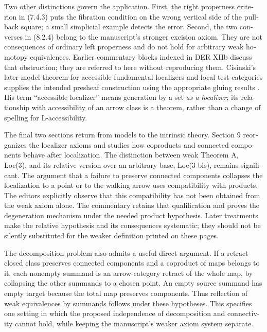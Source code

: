 \begin{otherlanguage}{english}
Two other distinctions govern the application. First, the right properness criterion in (7.4.3) puts the fibration condition on the wrong vertical side of the pullback square; a small simplicial example detects the error. Second, the two converses in (8.2.4) belong to the manuscript's stronger excision axiom. They are not consequences of ordinary left properness and do not hold for arbitrary weak homotopy equivalences. Earlier commentary blocks indexed in DER XIIb discuss that obstruction; they are referred to here without reproducing them. Cisinski's later model theorem for accessible fundamental localizers and local test categories supplies the intended presheaf construction using the appropriate gluing results \citep[Corollary 4.2.18]{Cisinski2006}. His term “accessible localizer” means generation by a set \emph{as a localizer}; its relationship with accessibility of an arrow class is a theorem, rather than a change of spelling for L-accessibility.

The final two sections return from models to the intrinsic theory. Section 9 reorganizes the localizer axioms and studies how coproducts and connected components behave after localization. The distinction between weak Theorem A, Loc(3), and its relative version over an arbitrary base, Loc(3 bis), remains significant. The argument that a failure to preserve connected components collapses the localization to a point or to the walking arrow uses compatibility with products. The editors explicitly observe that this compatibility has not been obtained from the weak axiom alone. The commentary retains that qualification and proves the degeneration mechanism under the needed product hypothesis. Later treatments make the relative hypothesis and its consequences systematic; they should not be silently substituted for the weaker definition printed on these pages.

The decomposition problem also admits a useful direct argument. If a retract-closed class preserves connected components and a coproduct of maps belongs to it, each nonempty summand is an arrow-category retract of the whole map, by collapsing the other summands to a chosen point. An empty source summand has empty target because the total map preserves components. Thus reflection of weak equivalences by summands follows under these hypotheses. This specifies one setting in which the proposed independence of decomposition and connectivity cannot hold, while keeping the manuscript's weaker axiom system separate.


\end{otherlanguage}
